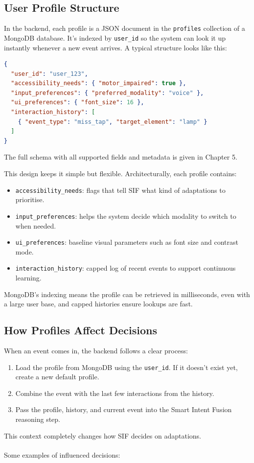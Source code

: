 \documentclass[openany]{book}
\begin{document}
\subsection{User Profile Structure}
In the backend, each profile is a JSON document in the \texttt{profiles} collection of a MongoDB database. It’s indexed by \texttt{user\_id} so the system can look it up instantly whenever a new event arrives. A typical structure looks like this:

\begin{lstlisting}[language=json, caption=Simplified User Profile Example]
{
  "user_id": "user_123",
  "accessibility_needs": { "motor_impaired": true },
  "input_preferences": { "preferred_modality": "voice" },
  "ui_preferences": { "font_size": 16 },
  "interaction_history": [
    { "event_type": "miss_tap", "target_element": "lamp" }
  ]
}
\end{lstlisting}
The full schema with all supported fields and metadata is given in Chapter 5.

This design keeps it simple but flexible. Architecturally, each profile contains:
\begin{itemize}
    \item \texttt{accessibility\_needs}: flags that tell SIF what kind of adaptations to prioritise.
    \item \texttt{input\_preferences}: helps the system decide which modality to switch to when needed.
    \item \texttt{ui\_preferences}: baseline visual parameters such as font size and contrast mode.
    \item \texttt{interaction\_history}: capped log of recent events to support continuous learning.
\end{itemize}
MongoDB’s indexing means the profile can be retrieved in milliseconds, even with a large user base, and capped histories ensure lookups are fast.

\subsection{How Profiles Affect Decisions}
When an event comes in, the backend follows a clear process:
\begin{enumerate}
    \item Load the profile from MongoDB using the \texttt{user\_id}. If it doesn’t exist yet, create a new default profile.
    \item Combine the event with the last few interactions from the history.
    \item Pass the profile, history, and current event into the Smart Intent Fusion reasoning step.
\end{enumerate}
This context completely changes how SIF decides on adaptations.\\\\
Some examples of influenced decisions:
\end{document}
